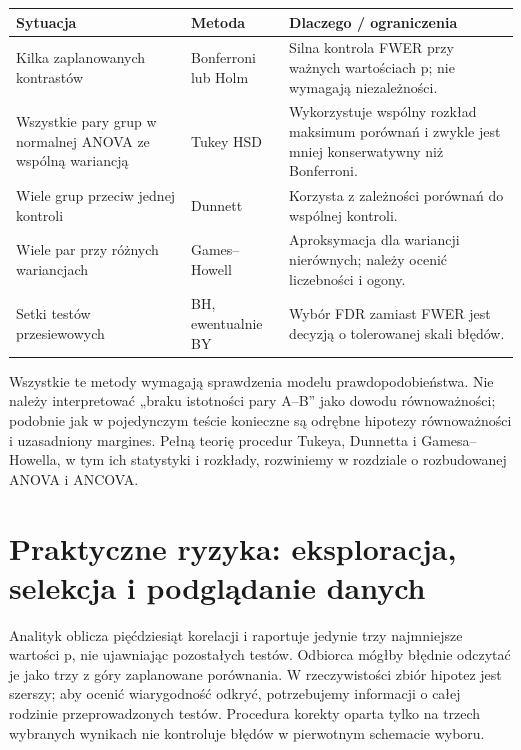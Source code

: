 \begin{center}\small
\begin{tabular}{>{\raggedright\arraybackslash}p{}>{\raggedright\arraybackslash}p{}>{\raggedright\arraybackslash}p{}}
\toprule
\textbf{Sytuacja} & \textbf{Metoda} & \textbf{Dlaczego / ograniczenia}\\
\midrule
Kilka zaplanowanych kontrastów & Bonferroni lub Holm & Silna kontrola FWER przy ważnych wartościach p; nie wymagają niezależności.\\
Wszystkie pary grup w normalnej ANOVA ze wspólną wariancją & Tukey HSD & Wykorzystuje wspólny rozkład maksimum porównań i zwykle jest mniej konserwatywny niż Bonferroni.\\
Wiele grup przeciw jednej kontroli & Dunnett & Korzysta z zależności porównań do wspólnej kontroli.\\
Wiele par przy różnych wariancjach & Games--Howell & Aproksymacja dla wariancji nierównych; należy ocenić liczebności i ogony.\\
Setki testów przesiewowych & BH, ewentualnie BY & Wybór FDR zamiast FWER jest decyzją o tolerowanej skali błędów.\\
\bottomrule
\end{tabular}
\end{center}

Wszystkie te metody wymagają sprawdzenia modelu
prawdopodobieństwa. Nie należy interpretować
„braku istotności pary A--B” jako dowodu równoważności;
podobnie jak w pojedynczym teście konieczne są
odrębne hipotezy równoważności i uzasadniony margines.
Pełną teorię procedur Tukeya, Dunnetta i Gamesa--Howella,
w tym ich statystyki i rozkłady, rozwiniemy w rozdziale
o rozbudowanej ANOVA i ANCOVA.

\section{Praktyczne ryzyka: eksploracja, selekcja i podglądanie danych}
\begin{przyklad}
Analityk oblicza pięćdziesiąt korelacji i raportuje
jedynie trzy najmniejsze wartości p, nie ujawniając
pozostałych testów. Odbiorca mógłby błędnie odczytać je
jako trzy z góry zaplanowane porównania. W rzeczywistości
zbiór hipotez jest szerszy; aby ocenić wiarygodność
odkryć, potrzebujemy informacji o całej rodzinie
przeprowadzonych testów. Procedura korekty oparta tylko
na trzech wybranych wynikach nie kontroluje błędów
w pierwotnym schemacie wyboru.
\end{przyklad}

